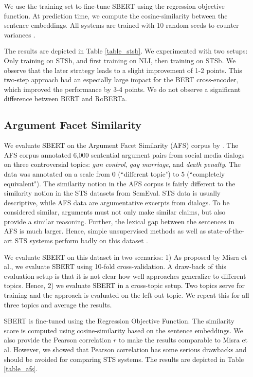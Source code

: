 \documentclass[11pt,a4paper]{article}
\begin{document}
We use the training set to fine-tune SBERT using the regression objective function. At prediction time, we compute the cosine-similarity between the sentence embeddings. All systems are trained with 10 random seeds to counter variances \cite{reimers_single_perf_score}.

The results are depicted in Table \ref{table_stsb}. We experimented with two setups: Only training on STSb, and first training on NLI, then training on STSb. We observe that the later strategy leads to a slight improvement of 1-2 points. This two-step approach had an especially large impact for the BERT cross-encoder, which improved the performance by 3-4 points. We do not observe a significant difference between BERT and RoBERTa.



\subsection{Argument Facet Similarity}
We evaluate SBERT on the Argument Facet Similarity (AFS) corpus by . The AFS corpus annotated 6,000 sentential argument pairs from social media dialogs on three controversial topics: \textit{gun control}, \textit{gay marriage}, and \textit{death penalty}. The data was annotated on a scale from 0 (``different topic") to 5 (``completely equivalent"). The similarity notion in the AFS corpus is fairly different to the similarity notion in the STS datasets from SemEval. STS data is usually descriptive, while AFS data are argumentative excerpts from dialogs. To be considered similar, arguments must not only make similar claims, but also provide a similar reasoning. Further, the lexical gap between the sentences in AFS is much larger. Hence, simple unsupervised methods as well as state-of-the-art STS systems perform badly on this dataset \cite{reimers-etal-2019-classification}.

We evaluate SBERT on this dataset in two scenarios: 1) As proposed by Misra et al., we evaluate SBERT using 10-fold cross-validation. A draw-back of this evaluation setup is that it is not clear how well approaches generalize to different topics. Hence, 2) we evaluate SBERT in a cross-topic setup. Two topics serve for training and the approach is evaluated on the left-out topic. We repeat this for all three topics and average the results.

SBERT is fine-tuned using the Regression Objective Function. The similarity score is computed using cosine-similarity based on the sentence embeddings. We also provide the Pearson correlation $r$ to make the results comparable to Misra et al. However, we showed \cite{Reimers2016_STS} that Pearson correlation has some serious drawbacks and should be avoided for comparing STS systems. The results are depicted in Table \ref{table_afs}. 
\end{document}
